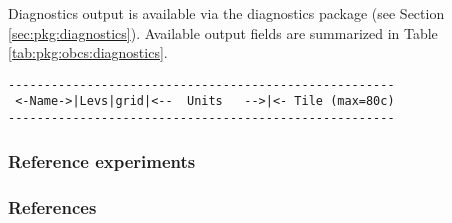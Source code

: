 Diagnostics output is available via the diagnostics package
(see Section \ref{sec:pkg:diagnostics}).
Available output fields are summarized in 
Table \ref{tab:pkg:obcs:diagnostics}.

\begin{table}[h!]
\centering
\label{tab:pkg:obcs:diagnostics}
{\footnotesize
\begin{verbatim}
------------------------------------------------------
 <-Name->|Levs|grid|<--  Units   -->|<- Tile (max=80c)
------------------------------------------------------

\end{verbatim}
}
\caption{~}
\end{table}


\subsubsection{Reference experiments}




\subsubsection{References}

